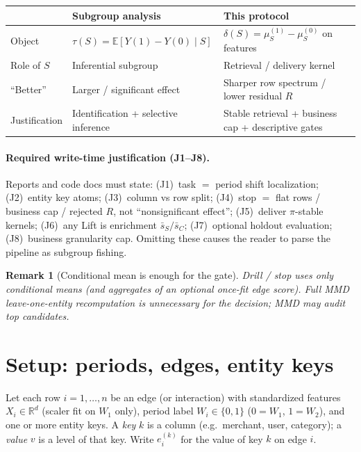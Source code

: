 \documentclass[11pt]{article}
\newtheorem{remark}{Remark}
\newcommand{\E}{\mathbb{E}}
\newcommand{\R}{\mathbb{R}}
\begin{document}
\begin{center}
\begin{tabular}{@{}lll@{}}
\toprule
 & Subgroup analysis & This protocol \\
\midrule
Object & \(\tau(S)=\E[Y(1)-Y(0)\mid S]\) &
  \(\delta(S)=\mu_{S}^{(1)}-\mu_{S}^{(0)}\) on features \\
Role of \(S\) & Inferential subgroup & Retrieval / delivery kernel \\
``Better'' & Larger / significant effect &
  Sharper row spectrum / lower residual \(R\) \\
Justification & Identification + selective inference &
  Stable retrieval + business cap + descriptive gates \\
\bottomrule
\end{tabular}
\end{center}

\paragraph{Required write-time justification (J1--J8).}
Reports and code docs must state: (J1)~task $=$ period shift
localization; (J2)~entity key atoms; (J3)~column vs row split;
(J4)~stop $=$ flat rows / business cap / rejected \(R\), not
``nonsignificant effect''; (J5)~deliver \(\pi\)-stable kernels;
(J6)~any Lift is enrichment \(\bar s_S/\bar s_C\); (J7)~optional
holdout evaluation; (J8)~business granularity cap. Omitting these
causes the reader to parse the pipeline as subgroup fishing.

\begin{remark}[Conditional mean is enough for the gate]
Drill / stop uses only conditional means (and aggregates of an optional
once-fit edge score). Full MMD leave-one-entity recomputation is
unnecessary for the decision; MMD may audit top candidates.
\end{remark}

\section{Setup: periods, edges, entity keys}
\label{sec:setup}

Let each row \(i=1,\ldots,n\) be an edge (or interaction) with
standardized features \(X_i\in\R^d\) (scaler fit on \(W_1\) only),
period label \(W_i\in\{0,1\}\) (\(0=W_1\), \(1=W_2\)), and one or more
entity keys. A \emph{key} \(k\) is a column (e.g.\ merchant, user,
category); a \emph{value} \(v\) is a level of that key. Write
\(e_i^{(k)}\) for the value of key \(k\) on edge \(i\).
\end{document}
